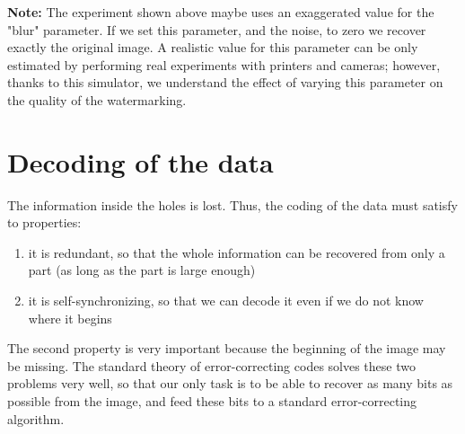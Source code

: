{\bf Note:} The experiment shown above maybe uses an exaggerated value for
the "blur" parameter.  If we set this parameter, and the noise, to zero we
recover exactly the original image.  A realistic value for this parameter can
be only estimated by performing real experiments with printers and cameras;
however, thanks to this simulator, we understand the effect of varying this
parameter on the quality of the watermarking.


\section{Decoding of the data}

The information inside the holes is lost.  Thus, the coding of the data must
satisfy to properties:

\begin{enumerate}
	\item it is redundant, so that the whole information can be recovered
		from only a part (as long as the part is large enough)
	\item it is self-synchronizing, so that we can decode it even if we
		do not know where it begins
\end{enumerate}

The second property is very important because the beginning of the image may
be missing.  The standard theory of error-correcting codes solves these two
problems very well, so that our only task is to be able to recover as many
bits as possible from the image, and feed these bits to a standard
error-correcting algorithm.


